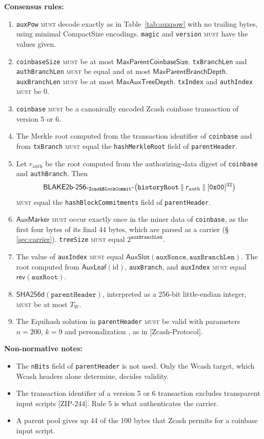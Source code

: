 \documentclass[10pt,letterpaper]{article}
\newcommand\MUST{\textsc{must}}
\newcommand\fn[1]{\mathsf{#1}}
\newcommand\cat{\mathbin{\|}}
\newcommand\ascii[1]{\text{\textquotedblleft\texttt{#1}\textquotedblright}}
\newcommand\rules[1]{\par\textbf{#1}}
\theoremstyle{plain}
\begin{document}
\rules{Consensus rules:}
\begin{enumerate}
\item \texttt{auxPow} \MUST{} decode exactly as in Table~\ref{tab:auxpow} with no trailing bytes, using minimal CompactSize encodings. \texttt{magic} and \texttt{version} \MUST{} have the values given.
\item \texttt{coinbaseSize} \MUST{} be at most $\fn{MaxParentCoinbaseSize}$. \texttt{txBranchLen} and \texttt{authBranchLen} \MUST{} be equal and at most $\fn{MaxParentBranchDepth}$. \texttt{auxBranchLen} \MUST{} be at most $\fn{MaxAuxTreeDepth}$. \texttt{txIndex} and \texttt{authIndex} \MUST{} be 0.
\item \texttt{coinbase} \MUST{} be a canonically encoded Zcash coinbase transaction of version 5 or 6.
\item The Merkle root computed from the transaction identifier of \texttt{coinbase} and from \texttt{txBranch} \MUST{} equal the \texttt{hashMerkleRoot} field of \texttt{parentHeader}.
\item Let $r_{\mathrm{auth}}$ be the root computed from the authorizing-data digest of \texttt{coinbase} and \texttt{authBranch}. Then
\[
\fn{BLAKE2b\text{-}256}_{\ascii{ZcashBlockCommit}}\bigl(\mathtt{historyRoot} \cat r_{\mathrm{auth}} \cat [\mathtt{0x00}]^{32}\bigr)
\]
\MUST{} equal the \texttt{hashBlockCommitments} field of \texttt{parentHeader}.
\item $\fn{AuxMarker}$ \MUST{} occur exactly once in the miner data of \texttt{coinbase}, as the first four bytes of its final 44 bytes, which are parsed as a carrier (\S\,\ref{sec:carrier}). \texttt{treeSize} \MUST{} equal $2^{\mathtt{auxBranchLen}}$.
\item The value of \texttt{auxIndex} \MUST{} equal $\fn{AuxSlot}(\mathtt{auxNonce}, \mathtt{auxBranchLen})$. The root computed from $\fn{AuxLeaf}(\mathrm{id})$, \texttt{auxBranch}, and \texttt{auxIndex} \MUST{} equal $\fn{rev}(\mathtt{auxRoot})$.
\item $\fn{SHA256d}(\mathtt{parentHeader})$, interpreted as a 256-bit little-endian integer, \MUST{} be at most $T_W$.
\item The Equihash solution in \texttt{parentHeader} \MUST{} be valid with parameters $n = 200$, $k = 9$ and personalization \ascii{ZcashPoW}, as in [Zcash-Protocol].
\end{enumerate}

\rules{Non-normative notes:}
\begin{itemize}
\item The \texttt{nBits} field of \texttt{parentHeader} is not used. Only the Wcash target, which Wcash headers alone determine, decides validity.
\item The transaction identifier of a version 5 or 6 transaction excludes transparent input scripts [ZIP-244]. Rule 5 is what authenticates the carrier.
\item A parent pool gives up 44 of the 100 bytes that Zcash permits for a coinbase input script.
\end{itemize}
\end{document}
